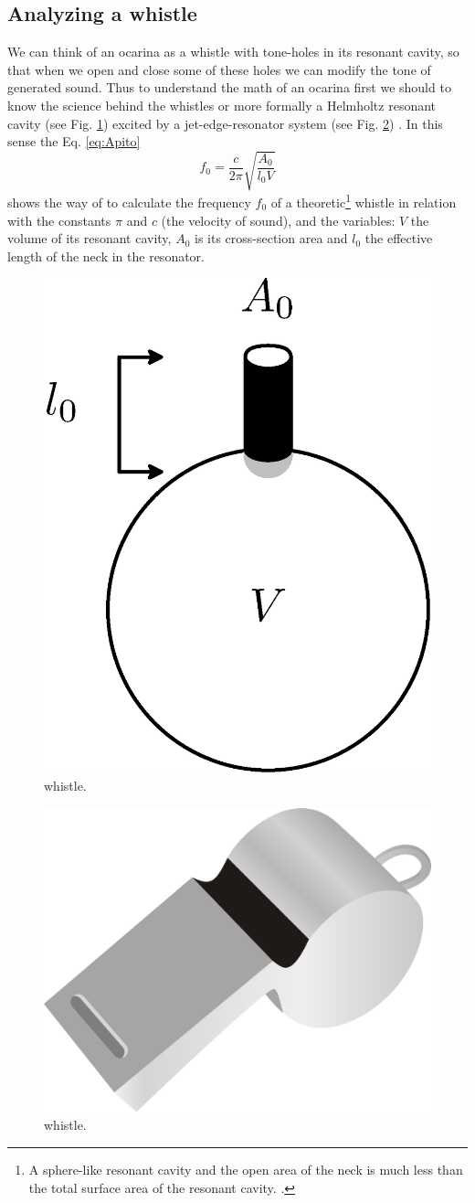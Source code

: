 \documentclass{article}
\begin{document}
\subsection{Analyzing a whistle}
We can think of an ocarina as a whistle with tone-holes in its resonant cavity,
so that when we open and close some of these holes we can modify the tone of generated sound.
Thus to understand the math of an ocarina first we should to know the science behind the whistles  
or more formally a Helmholtz resonant cavity \cite{corning2011resonance} (see Fig. \ref{fig:resonador}) excited by a jet-edge-resonator system (see Fig. \ref{football-referee-whistle}) \cite[pp. 3]{gibiat2013acoustic} \cite[pp. 138]{nyborg1953characteristics}. 
In this sense the Eq. \ref{eq:Apito} 
\begin{equation} 
\label{eq:Apito}
 f_0 = \frac{c}{2 \pi} \sqrt{\frac{A_{0}}{l_{0}V} }  
\end{equation}
shows the way of to calculate the frequency $f_0$ of a theoretic\footnote{A sphere-like resonant cavity and the open area of the neck is much less than the total surface area of the resonant cavity. .} whistle \cite[pp. 3]{gibiat2013acoustic} \cite[pp. 5]{kobayashi20093d} \cite[pp. 265]{okadanumerical}
in relation with the constants $\pi$  and $c$ (the velocity of sound),  and 
the variables: $V$ the volume of its resonant cavity,
$A_0$ is its cross-section area and $l_0$ the effective length of the neck in the resonator.


\begin{figure}[ht!]
\centering
\includegraphics[width=0.250\columnwidth]{resonador.eps}
\caption{whistle. }
\label{fig:resonador}
\end{figure}

\begin{figure}[ht!]
\centering
\includegraphics[width=0.250\columnwidth]{football-referee-whistle.eps}
\caption{whistle. }
\label{football-referee-whistle}
\end{figure}
\end{document}
